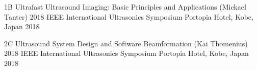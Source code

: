 
\begin{cvhonors}

  \cvhonor
    {1B Ultrafast Ultrasound Imaging: Basic Principles and Applications (Mickael Tanter)} %
    {2018 IEEE International Ultrasonics Symposium} %
    {Portopia Hotel, Kobe, Japan} %
    {2018} %

  \cvhonor
    {2C Ultrasound System Design and Software Beamformation (Kai Thomenius)} %
    {2018 IEEE International Ultrasonics Symposium} %
    {Portopia Hotel, Kobe, Japan} %
    {2018} %

\end{cvhonors}
